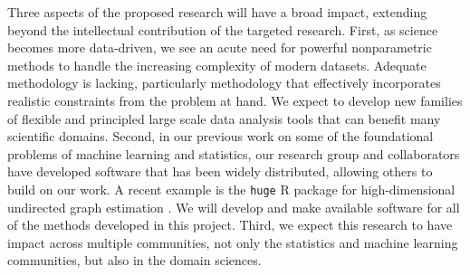 
Three aspects of the proposed research will have a broad impact,
extending beyond the intellectual contribution of the targeted
research.  First, as science becomes more data-driven, we see an
acute need for powerful nonparametric methods to handle
the increasing complexity of modern datasets.  Adequate
methodology is lacking, particularly methodology that
effectively incorporates realistic constraints from the problem at hand.
We expect to develop new families of flexible and principled
large scale data analysis tools that can benefit many
scientific domains.  Second, in our previous work
on some of the foundational problems of
machine learning and statistics, our research group and
collaborators have developed software that has been widely
distributed, allowing others to build on our work.  A 
recent example is the \texttt{huge} R package for high-dimensional
undirected graph estimation \citep{huge}. We will develop and 
make available software for all of the methods developed in
this project.  Third, we expect this research to have impact
across multiple communities, not only the statistics and
machine learning communities, 
but also in the domain sciences.


